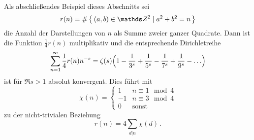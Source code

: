 Als abschließendes Beispiel dieses Abschnitts sei
\[
r(n) = \# \Set{ (a,b) \in \ZZ^2 \mid a^2 + b^2 = n}
\]
die Anzahl der Darstellungen von $n$ als Summe zweier ganzer Quadrate.
Dann ist die Funktion $\frac{1}{4}r(n)$ multiplikativ und die entsprechende Dirichletreihe
\[
\sum_{n=1}^\infty \frac{1}{4} r(n) n^{-s}
= \zeta(s) \Bigl( 1 - \frac{1}{3^s} + \frac{1}{5^s} - \frac{1}{7^s} + \frac{1}{9^s} - \ldots \Bigr)
\]
ist für $\Re s > 1$ absolut konvergent. Dies führt mit 
\[
\chi(n)
= \begin{cases}
1 & n \equiv 1 \mod 4 \\
-1 & n \equiv 3 \mod 4 \\
0 & \text{sonst}
\end{cases}
\]
zu der nicht-trivialen Beziehung
\[
r(n) = 4\sum_{d|n} \chi(d)
\,.
\]